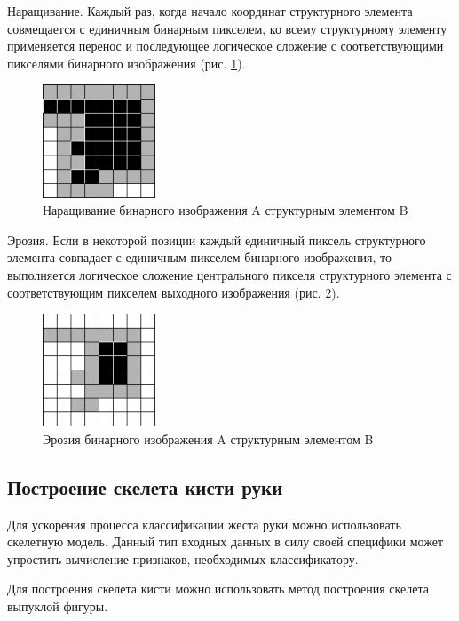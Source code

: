 Наращивание. Каждый раз, когда начало координат структурного элемента совмещается с единичным бинарным пикселем, ко всему структурному элементу применяется перенос и последующее логическое сложение с соответствующими пикселями бинарного изображения (рис. \ref{an:dil}).

\begin{figure}[!h]
	\centering
	\includegraphics[width=0.3\textwidth]{inc/img/dil}
	\caption{Наращивание бинарного изображения A структурным элементом B}
	\label{an:dil}
\end{figure}

Эрозия. Если в некоторой позиции каждый единичный пиксель структурного элемента совпадает с единичным пикселем бинарного изображения, то выполняется логическое сложение центрального пикселя структурного элемента с соответствующим пикселем выходного изображения (рис. \ref{an:eros}).

\begin{figure}[!h]
	\centering
	\includegraphics[width=0.3\textwidth]{inc/img/eros}
	\caption{Эрозия бинарного изображения A структурным элементом B}
	\label{an:eros}
\end{figure}

\subsection{Построение скелета кисти руки}

Для ускорения процесса классификации жеста руки можно использовать скелетную модель. Данный тип входных данных в силу своей специфики может упростить вычисление признаков, необходимых классификатору.

Для построения скелета кисти можно использовать метод построения скелета выпуклой фигуры\cite{DIP}.

